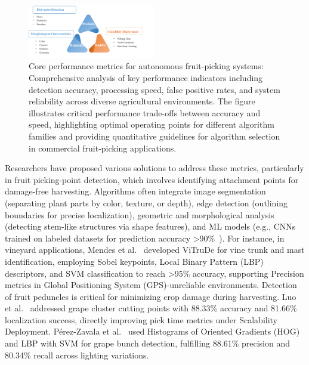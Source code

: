 \documentclass{ieeeaccess}
\begin{document}
\begin{figure}[hbtp]
\centering
\includegraphics[width=0.5\textwidth]{fig_performance.png}
\caption{Core performance metrics for autonomous fruit-picking systems: Comprehensive analysis of key performance indicators including detection accuracy, processing speed, false positive rates, and system reliability across diverse agricultural environments. The figure illustrates critical performance trade-offs between accuracy and speed, highlighting optimal operating points for different algorithm families and providing quantitative guidelines for algorithm selection in commercial fruit-picking applications.}
\label{fig:performance}
\end{figure}

Researchers have proposed various solutions to address these metrics, particularly in fruit picking-point detection, which involves identifying attachment points for damage-free harvesting. Algorithms often integrate image segmentation (separating plant parts by color, texture, or depth), edge detection (outlining boundaries for precise localization), geometric and morphological analysis (detecting stem-like structures via shape features), and ML models (e.g., CNNs trained on labeled datasets for prediction accuracy >90\%~\cite{mendes2016vine}).
For instance, in vineyard applications, Mendes et al.~\cite{mendes2016vine} developed ViTruDe for vine trunk and mast identification, employing Sobel keypoints, Local Binary Pattern (LBP) descriptors, and SVM classification to reach >95\% accuracy, supporting Precision metrics in  Global Positioning System (GPS)-unreliable environments.
Detection of fruit peduncles is critical for minimizing crop damage during harvesting. 
Luo et al.~\cite{luo2018vision} addressed grape cluster cutting points with 88.33\% accuracy and 81.66\% localization success, directly improving pick time metrics under Scalability Deployment.
Pérez-Zavala et al.~\cite{perez2018pattern} used Histograms of Oriented Gradients (HOG) and LBP with SVM for grape bunch detection, fulfilling 88.61\% precision and 80.34\% recall across lighting variations.
\end{document}
